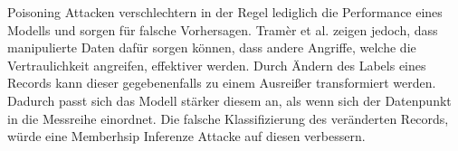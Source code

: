 Poisoning Attacken verschlechtern in der Regel lediglich die Performance eines Modells und sorgen für falsche Vorhersagen.
Tramèr et al. \cite{P-14} zeigen jedoch, dass manipulierte Daten dafür sorgen können, dass andere Angriffe, welche die Vertraulichkeit angreifen, effektiver werden.
Durch Ändern des Labels eines Records kann dieser gegebenenfalls zu einem Ausreißer transformiert werden. 
Dadurch passt sich das Modell stärker diesem an, als wenn sich der Datenpunkt in die Messreihe einordnet.
Die falsche Klassifizierung des veränderten Records, würde eine Memberhsip Inferenze Attacke auf diesen verbessern.
